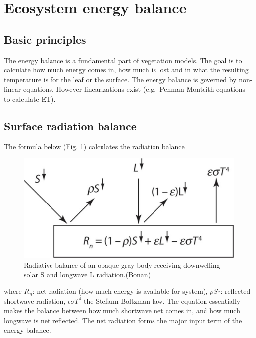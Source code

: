 \documentclass[12pt,oneside]{book}
\begin{document}
\section{Ecosystem energy balance}\label{ecosystem-energy-balance}

\subsection{Basic principles}\label{basic-principles}

The energy balance is a fundamental part of vegetation models. The goal
is to calculate how much energy comes in, how much is lost and in what
the resulting temperature is for the leaf or the surface. The energy
balance is governed by non-linear equations. However linearizations
exist (e.g.~Penman Monteith equations to calculate ET).

\subsection{Surface radiation balance}\label{surface-radiation-balance}

The formula below (Fig. \ref{fig:f329}) calculates the radiation balance

\begin{figure}

{\centering \includegraphics[width=0.8\linewidth]{figures/chap3/f329_rad_balance} 

}

\caption{Radiative balance of an opaque gray body receiving downwelling solar S and longwave L radiation.(Bonan)}\label{fig:f329}
\end{figure}

where \(R_n\): net radiation (how much energy is available for system),
\(\rho S^{\downarrow}\): reflected shortwave radiation,
\(\epsilon \sigma T^{4}\) the Stefann-Boltzman law. The equation
essentially makes the balance between how much shortwave net comes in,
and how much longwave is net reflected. The net radiation forms the
major input term of the energy balance.
\end{document}
